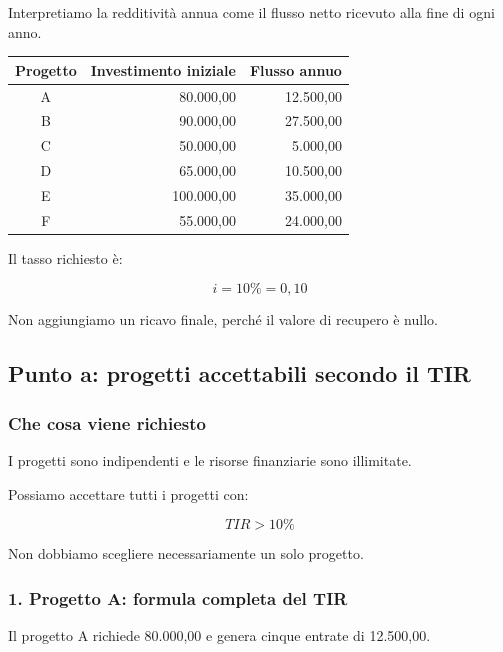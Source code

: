 \noindent Interpretiamo la redditività annua
come il flusso netto ricevuto
alla fine di ogni anno.

\begin{center}
    \begin{tabular}{|c|r|r|}
        \hline
        \textbf{Progetto}
        & \textbf{Investimento iniziale}
        & \textbf{Flusso annuo} \\
        \hline
        A & 80.000,00 & 12.500,00 \\
        B & 90.000,00 & 27.500,00 \\
        C & 50.000,00 & 5.000,00 \\
        D & 65.000,00 & 10.500,00 \\
        E & 100.000,00 & 35.000,00 \\
        F & 55.000,00 & 24.000,00 \\
        \hline
    \end{tabular}
\end{center}

\noindent Il tasso richiesto è:

\[
\boxed{i=10\%=0{,}10}
\]

\noindent Non aggiungiamo un ricavo finale,
perché il valore di recupero è nullo.


\subsection{Punto a:
progetti accettabili secondo il TIR}

\subsubsection*{Che cosa viene richiesto}

\noindent I progetti sono indipendenti
e le risorse finanziarie sono illimitate.

\noindent Possiamo accettare
tutti i progetti con:

\[
\boxed{TIR>10\%}
\]

\noindent Non dobbiamo scegliere
necessariamente un solo progetto.


\subsubsection*{1. Progetto A:
formula completa del TIR}

\noindent Il progetto A richiede 80.000,00
e genera cinque entrate di 12.500,00.

